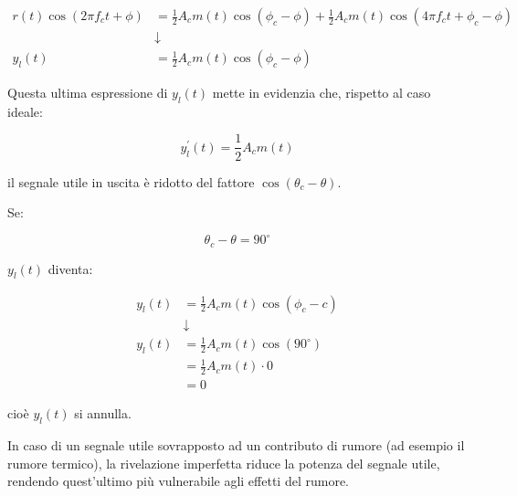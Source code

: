 {
    \Large 
    \begin{equation}
        \begin{split}
            r(t) \cos(2 \pi f_c t + \phi)
            &= 
            \frac{1}{2} A_c m(t) \cos(\phi_c - \phi)
            + 
            \frac{1}{2} A_c m(t) \cos(4 \pi f_c t + \phi_c - \phi)
            \\
            &\downarrow
            \\
            y_l (t)
            &= 
            \frac{1}{2} A_c m(t) \cos(\phi_c - \phi)
        \end{split}
    \end{equation}
}

Questa ultima espressione di $y_l (t)$ mette in evidenzia che, rispetto al caso ideale: 

{
    \Large 
    \begin{equation}
        y_l^{'} (t) = \frac{1}{2} A_c m(t)
    \end{equation}
}

il segnale utile in uscita è ridotto del fattore $\cos(\theta_c - \theta)$. \newline 

Se: 

{
    \Large 
    \begin{equation}
        \theta_c - \theta = 90 ^{\circ}
    \end{equation}
}

$y_l (t)$ diventa: 

{
    \Large 
    \begin{equation}
       \begin{split}
        y_l (t)
            &= 
            \frac{1}{2} A_c m(t) \cos(\phi_c - c)
            \\
            &\downarrow
            \\
            y_l (t)
            &= 
            \frac{1}{2} A_c m(t) \cos(90 ^{\circ})
            \\
            &= 
            \frac{1}{2} A_c m(t) \cdot 0 
            \\
            &= 
            0
       \end{split} 
    \end{equation}
}

cioè $y_l (t)$ si annulla. \newline 

In caso di un segnale utile sovrapposto ad un contributo di rumore (ad esempio il rumore termico), 
la rivelazione imperfetta riduce la potenza del segnale utile, rendendo quest'ultimo più vulnerabile agli effetti del rumore. \newline 

